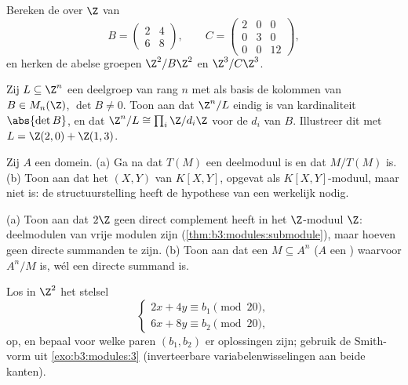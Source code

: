 \begin{exercise}[$\star$]\label{exo:b3:modules:3}
Bereken de  over $\Z$ van
\[
B = \begin{pmatrix} 2 & 4\\ 6 & 8 \end{pmatrix},
\qquad
C = \begin{pmatrix} 2 & 0 & 0\\ 0 & 3 & 0\\ 0 & 0 & 12
\end{pmatrix},
\]
en herken de abelse groepen $\Z^2/B\Z^2$ en $\Z^3/C\Z^3$.
\end{exercise}

\begin{exercise}[$\star\star$]\label{exo:b3:modules:4}
Zij $L \subseteq \Z^n$ een deelgroep van rang $n$ met als basis de
kolommen van $B \in M_n(\Z)$, $\det B \neq 0$. Toon aan dat $\Z^n/L$
eindig is van kardinaliteit $\abs{\det B}$, en dat $\Z^n/L \cong
\prod_i \Z/d_i\Z$ voor de  $d_i$ van $B$.
Illustreer dit met $L = \Z(2,0) + \Z(1,3)$.
\end{exercise}

\begin{exercise}[$\star\star$]\label{exo:b3:modules:5}
Zij $A$ een domein. (a) Ga na dat $T(M)$ een deelmoduul is en dat
$M/T(M)$  is. (b) Toon aan dat het  $(X, Y)$ van
$K[X,Y]$, opgevat als $K[X,Y]$-moduul,  maar niet 
is: de structuurstelling heeft de hypothese van een
 werkelijk nodig.
\end{exercise}

\begin{exercise}[$\star\star$]\label{exo:b3:modules:6}
(a) Toon aan dat $2\Z$ geen direct complement heeft in het
$\Z$-moduul $\Z$: deelmodulen van vrije modulen zijn 
(\cref{thm:b3:modules:submodule}), maar hoeven geen directe
summanden te zijn. (b) Toon aan dat een $M \subseteq A^n$ ($A$ een
) waarvoor $A^n/M$  is, wél een directe
summand is.
\end{exercise}

\begin{exercise}[$\star\star$]\label{exo:b3:modules:7}
Los in $\Z^2$ het stelsel
\[
\begin{cases}
2x + 4y \equiv b_1 \pmod{20},\\
6x + 8y \equiv b_2 \pmod{20},
\end{cases}
\]
op, en bepaal voor welke paren $(b_1, b_2)$ er oplossingen zijn;
gebruik de Smith-vorm uit \cref{exo:b3:modules:3} (inverteerbare
variabelenwisselingen aan beide kanten).
\end{exercise}


